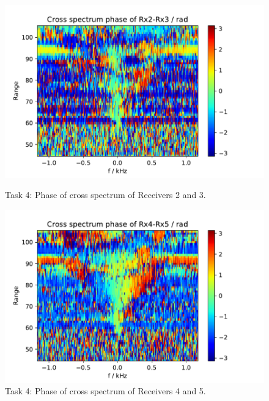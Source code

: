 \begin{figure}
    \centering
    \begin{minipage}{0.48\textwidth}
        \centering
        \includegraphics[width=\textwidth]{graphics/t4/t4-phase-2-3.pdf}
    \caption{Task 4: Phase of cross spectrum of Receivers 2 and 3.}
    \label{fig:t4-phase-2-3}
    \end{minipage}\hfill
    \begin{minipage}{0.48\textwidth}
        \centering
        \includegraphics[width=\textwidth]{graphics/t4/t4-phase-4-5.pdf}
    \caption{Task 4: Phase of cross spectrum of Receivers 4 and 5.}
    \label{fig:t4-phase-4-5}
    \end{minipage}
\end{figure}
